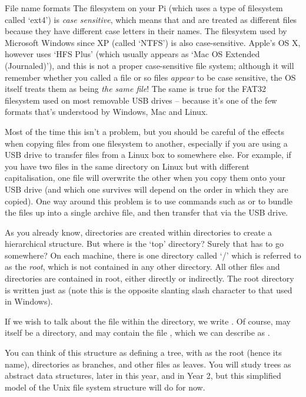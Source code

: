 \begin{danger}{File name formats}
The filesystem on your Pi (which uses a type of filesystem called `ext4') is \textit{case sensitive}, which means that  and  are treated as different files because they have different case letters in their names. The filesystem used by Microsoft Windows since XP (called `NTFS') is also case-sensitive. Apple's OS X, however uses `HFS Plus' (which usually appears as `Mac OS Extended (Journaled)'), and this is not a proper case-sensitive file system; although it will remember whether you called a file  or  so files \textit{appear} to be case sensitive, the OS itself treats them as being \textit{the same file}! The same is true for the FAT32 filesystem used on most removable USB drives -- because it's one of the few formats that's understood by Windows, Mac and Linux. 

Most of the time this isn't a problem, but you should be careful of the effects when copying files from one filesystem to another, especially if you are using a USB drive to transfer files from a Linux box to somewhere else. For example, if you have two files in the same directory on Linux but with different capitalisation, one file will overwrite the other when you copy them onto your USB drive (and which one survives will depend on the order in which they are copied). One way around this problem is to use commands such as   or  to bundle the files up into a single archive file, and then transfer that via the USB drive. 
\end{danger}

As you already know, directories are created within directories to create a hierarchical structure. But where is the `top' directory? Surely that has to go somewhere? On each machine, there is one directory called `/' which is referred to as the \textit{root}, which is not contained in any other directory. All other files and directories are contained in root, either directly or indirectly. The root directory is written just as \fname{/} (note this is the opposite slanting slash character to that used in Windows). 

If we wish to talk about the file  within the directory,  we write . Of course,  may itself be a directory, and may contain the file , which we can describe as .

You can think of this structure as defining a tree, with \fname{/} as the root (hence its name), directories as branches, and other files as leaves. You will study trees as abstract data structures, later in this year, and in Year 2, but this simplified model of the Unix file system structure will do for now. 

